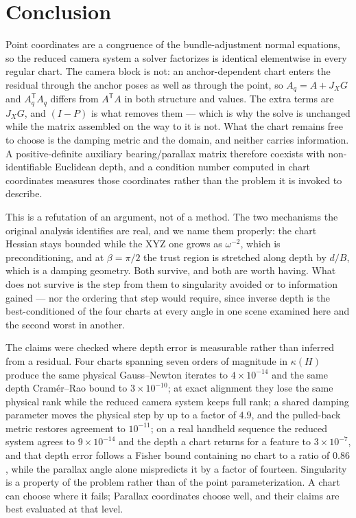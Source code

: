 \documentclass[11pt,a4paper]{article}
\theoremstyle{definition}
\theoremstyle{remark}
\newcommand{\T}{\mathsf{T}}
\begin{document}
\section{Conclusion}
Point coordinates are a congruence of the bundle-adjustment normal equations, so the reduced camera system a solver factorizes is identical elementwise in every regular chart. The camera block is not: an anchor-dependent chart enters the residual through the anchor poses as well as through the point, so $A_q=A+J_XG$ and $A_q^{\T}A_q$ differs from $A^{\T}A$ in both structure and values. The extra terms are $J_XG$, and $(I-P)$ is what removes them --- which is why the solve is unchanged while the matrix assembled on the way to it is not. What the chart remains free to choose is the damping metric and the domain, and neither carries information. A positive-definite auxiliary bearing/parallax matrix therefore coexists with non-identifiable Euclidean depth, and a condition number computed in chart coordinates measures those coordinates rather than the problem it is invoked to describe.

This is a refutation of an argument, not of a method. The two mechanisms the original analysis identifies are real, and we name them properly: the chart Hessian stays bounded while the XYZ one grows as $\omega^{-2}$, which is preconditioning, and at $\beta=\pi/2$ the trust region is stretched along depth by $d/B$, which is a damping geometry. Both survive, and both are worth having. What does not survive is the step from them to singularity avoided or to information gained --- nor the ordering that step would require, since inverse depth is the best-conditioned of the four charts at every angle in one scene examined here and the second worst in another.

The claims were checked where depth error is measurable rather than inferred from a residual. Four charts spanning seven orders of magnitude in $\kappa(H)$ produce the same physical Gauss--Newton iterates to $4\times10^{-14}$ and the same depth Cram\'er--Rao bound to $3\times10^{-10}$; at exact alignment they lose the same physical rank while the reduced camera system keeps full rank; a shared damping parameter moves the physical step by up to a factor of $4.9$, and the pulled-back metric restores agreement to $10^{-11}$; on a real handheld sequence the reduced system agrees to $9\times10^{-14}$ and the depth a chart returns for a feature to $3\times10^{-7}$, and that depth error follows a Fisher bound containing no chart to a ratio of $0.86$, while the parallax angle alone mispredicts it by a factor of fourteen. Singularity is a property of the problem rather than of the point parameterization. A chart can choose where it fails; Parallax coordinates choose well, and their claims are best evaluated at that level.
\end{document}
